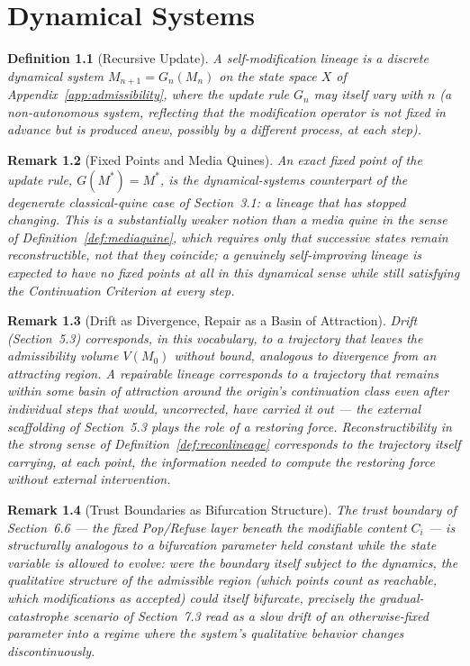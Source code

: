 \documentclass[11pt]{book}
\newtheorem{definition}{Definition}[chapter]
\newtheorem{remark}[definition]{Remark}
\begin{document}
\chapter{Dynamical Systems}
\label{app:dynamical}

\begin{definition}[Recursive Update]
A self-modification lineage is a discrete dynamical system $M_{n+1}=G_n(M_n)$ on the state space $X$ of Appendix~\ref{app:admissibility}, where the update rule $G_n$ may itself vary with $n$ (a non-autonomous system, reflecting that the modification operator is not fixed in advance but is produced anew, possibly by a different process, at each step).
\end{definition}

\begin{remark}[Fixed Points and Media Quines]
An exact fixed point of the update rule, $G(M^*)=M^*$, is the dynamical-systems counterpart of the degenerate classical-quine case of Section~3.1: a lineage that has stopped changing. This is a substantially weaker notion than a media quine in the sense of Definition~\ref{def:mediaquine}, which requires only that successive states remain reconstructible, not that they coincide; a genuinely self-improving lineage is expected to have no fixed points at all in this dynamical sense while still satisfying the Continuation Criterion at every step.
\end{remark}

\begin{remark}[Drift as Divergence, Repair as a Basin of Attraction]
Drift (Section~5.3) corresponds, in this vocabulary, to a trajectory that leaves the admissibility volume $V(M_0)$ without bound, analogous to divergence from an attracting region. A repairable lineage corresponds to a trajectory that remains within some basin of attraction around the origin's continuation class even after individual steps that would, uncorrected, have carried it out --- the external scaffolding of Section~5.3 plays the role of a restoring force. Reconstructibility in the strong sense of Definition~\ref{def:reconlineage} corresponds to the trajectory itself carrying, at each point, the information needed to compute the restoring force without external intervention.
\end{remark}

\begin{remark}[Trust Boundaries as Bifurcation Structure]
The trust boundary of Section~6.6 --- the fixed Pop/Refuse layer beneath the modifiable content $C_i$ --- is structurally analogous to a bifurcation parameter held constant while the state variable is allowed to evolve: were the boundary itself subject to the dynamics, the qualitative structure of the admissible region (which points count as reachable, which modifications as accepted) could itself bifurcate, precisely the gradual-catastrophe scenario of Section~7.3 read as a slow drift of an otherwise-fixed parameter into a regime where the system's qualitative behavior changes discontinuously.
\end{remark}
\end{document}

